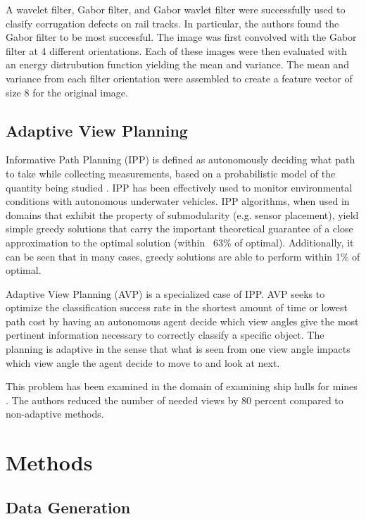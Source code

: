 \documentclass[letterpaper, 10 pt, conference]{ieeeconf}  %
\begin{document}
A wavelet filter, Gabor filter, and Gabor wavlet filter were successfully used to clasify corrugation defects on rail tracks\cite{railDefect}. In particular, the authors found the Gabor filter to be most successful. The image was first convolved with the Gabor filter at 4 different orientations. Each of these images were then evaluated with an energy distrubution function yielding the mean and variance.  The mean and variance from each filter orientation were assembled to create a feature vector of size 8 for the original image.

\subsection{Adaptive View Planning}

Informative Path Planning (IPP) is defined as autonomously deciding what path to take while collecting measurements, based on a probabilistic model of the quantity being studied \cite{BNBIPP}. IPP has been effectively used to monitor environmental conditions with autonomous underwater vehicles\cite{BNBIPP}\cite{underwaterIPP}. IPP algorithms, when used in domains that exhibit the property of submodularity (e.g. sensor placement), yield simple greedy solutions that carry the important theoretical guarantee of a close approximation to the optimal solution (within ~63\% of optimal). Additionally, it can be seen that in many cases, greedy solutions are able to perform within 1\% of optimal. 

Adaptive View Planning (AVP) is a specialized case of IPP. AVP seeks to optimize the classification success rate in the shortest amount of time or lowest path cost by having an autonomous agent decide which view angles give the most pertinent information necessary to correctly classify a specific object. The planning is adaptive in the sense that what is seen from one view angle impacts which view angle the agent decide to move to and look at next. 

This problem has been examined in the domain of examining ship hulls for mines \cite{hollinger2011active}. The authors reduced the number of needed views by 80 percent compared to non-adaptive methods.

\section{Methods}

\subsection{Data Generation}
\end{document}

